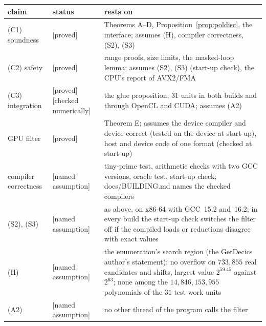 \documentclass[10pt,a4paper]{article}
\newcommand{\stproved}{\textsf{\small[proved]}\xspace}
\newcommand{\stnum}{\textsf{\small[checked numerically]}\xspace}
\newcommand{\stassume}{\textsf{\small[named assumption]}\xspace}
\theoremstyle{plain}
\theoremstyle{definition}
\begin{document}
\begin{center}\footnotesize
\begin{tabularx}{\textwidth}{@{}>{\raggedright\arraybackslash}p{}>{\raggedright\arraybackslash}p{}X@{}}
\toprule
claim & status & rests on \\ \midrule
(C1) soundness & \stproved & Theorems A--D, Proposition~\ref{prop:poldisc}, the interface; assumes (H), compiler correctness, (S2), (S3) \\
(C2) safety & \stproved & range proofs, size limits, the masked-loop lemma; assumes (S2), (S3) (start-up check), the CPU's report of AVX2/FMA \\
(C3) integration & \stproved{} \stnum & the glue proposition; $31$ units in both builds and through OpenCL and CUDA; assumes (A2) \\
GPU filter & \stproved & Theorem E; assumes the device compiler and device correct (tested on the device at start-up), host and device code of one format (checked at start-up) \\ \midrule
compiler correctness & \stassume & tiny-prime test, arithmetic checks with two GCC versions, oracle test, start-up check; docs/BUILDING.md names the checked compilers \\
(S2), (S3) & \stassume & as above, on x86-64 with GCC~15.2 and~16.2; in every build the start-up check switches the filter off if the compiled loads or reductions disagree with exact values \\
(H) & \stassume & the enumeration's search region (the GetDecics author's statement); no overflow on $733{,}855$ real candidates and shifts, largest value $2^{59.45}$ against $2^{63}$; none among the $14{,}846{,}153{,}955$ polynomials of the $31$ test work units \\
(A2) & \stassume & no other thread of the program calls the filter \\
\bottomrule
\end{tabularx}
\end{center}
\end{document}
